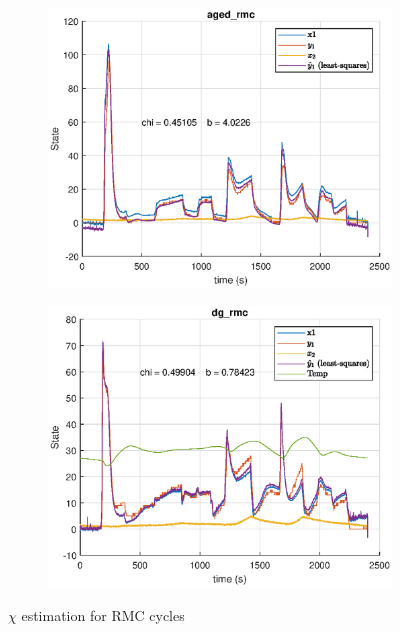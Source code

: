\begin{figure}[H]
    \begin{minipage}{0.49\textwidth}
        \begin{figure}[H]
            \includegraphics[width=\textwidth]{./figs/chi_est/aged_rmc_chi.eps}
        \end{figure}
    \end{minipage}
    \begin{minipage}{0.49\textwidth}
        \begin{figure}[H]
            \includegraphics[width=\textwidth]{./figs/chi_est/dg_rmc_chi.eps}
        \end{figure}
    \end{minipage}
        \caption{$\chi$ estimation for RMC cycles}
\end{figure}

